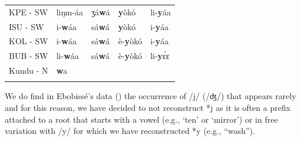 \documentclass[output=paper,colorlinks,citecolor=brown
]{langscibook}
\begin{document}
\begin{table}
\begin{tabular}{lllll}
KPE - SW                  & liŋm-áa              & ʒá\textbf{w}á                  & \textbf{y}òkó                  & li-\textbf{y}áa                       \\
ISU - SW                  & i-\textbf{w}áa                & sá\textbf{w}á                  & \textbf{y}òkó                  & i-\textbf{y}áa                        \\
KOL - SW                  & i-\textbf{w}áa                & sá\textbf{w}á                  & è-\textbf{y}òkó               & i-\textbf{y}áa                        \\
BUB - SW                  & li-\textbf{w}áa               & sá\textbf{w}á                  & è-\textbf{y}òkó               & li-\textbf{y}ɛ́ɛ                      \\
Kundu - N                 & \textbf{w}a                    &                         &                         &   \\
   \lspbottomrule
 \end{tabular}
\end{table}

We do find in Ebobissé’s data (\citeyear{ebobisse2015}) the occurrence of /j/ (/ʤ/) that appears rarely and for this reason, we have decided to not reconstruct *j as it is often a prefix attached to a root that starts with a vowel (e.g.,  `ten' or `mirror') or in free variation with /y/ for which we have reconstructed *y (e.g.,  “wash”).
\end{document}
